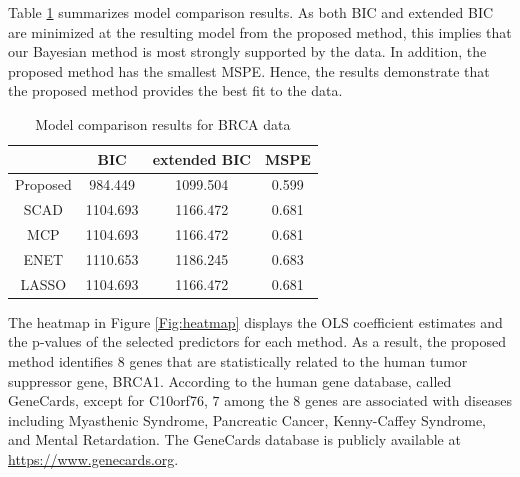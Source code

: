 \documentclass[twocolumn]{svjour3}       %
\newcommand{\0}{\boldsymbol 0} %
\newcommand{\1}{\boldsymbol 1} %
\begin{document}
{Table \ref{T:realdata} summarizes model comparison results. As both BIC and extended BIC are minimized at the resulting model from the proposed method, this implies that our Bayesian method is most strongly supported by the data. In addition, the proposed method has the smallest MSPE. Hence, the results demonstrate that the proposed method provides the best fit to the data. 
\begin{table}[t]
\centering
\caption{Model comparison results for BRCA data}\label{T:realdata}
 \begin{tabular}{cccc}
\hline
            & BIC     & extended BIC &  MSPE    \\
\hline
  Proposed       & 984.449  & 1099.504 &  0.599\\
  SCAD           & 1104.693 & 1166.472& 0.681 \\
  MCP           & 1104.693 & 1166.472& 0.681  \\
  ENET           & 1110.653 & 1186.245&  0.683 \\
  LASSO         & 1104.693 & 1166.472  &  0.681\\
\hline
 \end{tabular}
\end{table}
The heatmap in Figure \ref{Fig:heatmap} displays the OLS coefficient estimates and the p-values of the selected predictors for each method. As a result, the proposed method identifies $8$ genes that are statistically related to the human tumor suppressor gene, BRCA1. According to the human gene database, called GeneCards, except for C10orf76, $7$ among the $8$ genes are associated with diseases including Myasthenic Syndrome, Pancreatic Cancer, Kenny-Caffey Syndrome, and Mental Retardation. The GeneCards database is publicly available at \url{https://www.genecards.org}.


}
\end{document}

